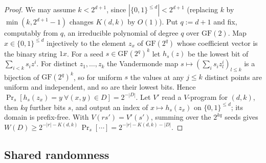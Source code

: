 \begin{proof}
We may assume $k<2^{d+1}$, since $|\{0,1\}^{\le d}|<2^{d+1}$ (replacing $k$ by $\min(k,2^{d+1}-1)$ changes $K(d,k)$ by $O(1)$). Put $q:=d+1$ and fix, computably from $q$, an irreducible polynomial of degree $q$ over $\mathrm{GF}(2)$. Map $x\in\{0,1\}^{\le d}$ injectively to the element $z_x$ of $\mathrm{GF}(2^q)$ whose coefficient vector is the binary string $1x$. For a seed $s\in\mathrm{GF}(2^q)^k$ let $h_s(z)$ be the lowest bit of $\sum_{i<k}s_iz^i$. For distinct $z_1,\dots,z_k$ the Vandermonde map $s\mapsto(\sum_is_iz_l^i)_{l\le k}$ is a bijection of $\mathrm{GF}(2^q)^k$, so for uniform $s$ the values at any $j\le k$ distinct points are uniform and independent, and so are their lowest bits. Hence $\Pr_s[h_s(z_x)=y\ \forall(x,y)\in D]=2^{-|D|}$. Let $V'$ read a $V$-program for $(d,k)$, then $kq$ further bits $s$, and output an index of $x\mapsto h_s(z_x)$ on $\{0,1\}^{\le d}$; its domain is prefix-free. With $V(rs')=V'(s')$, summing over the $2^{kq}$ seeds gives $W(D)\ge2^{-|r|-K(d,k)}\,\Pr_s[\cdots]=2^{-|r|-K(d,k)-|D|}$.
\end{proof}

\subsection{Shared randomness}\label{app:versions:shared}

